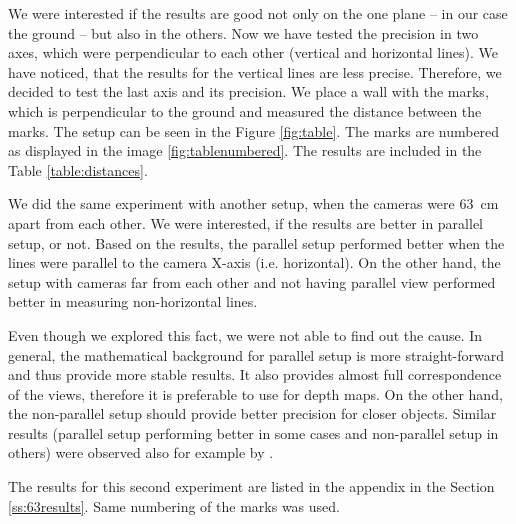We were interested if the results are good not only on the one plane -- in our
case the ground -- but also in the others. Now we have tested the precision in
two axes, which were perpendicular to each other (vertical and horizontal
lines). We have noticed, that the results for the vertical lines are less
precise. Therefore, we decided to test the last axis and its precision. We place
a wall with the marks, which is perpendicular to the ground and measured the
distance between the marks. The setup can be seen in the Figure
\ref{fig:table}. The marks are numbered as displayed in the image
\ref{fig:tablenumbered}. The results are included in the Table
\ref{table:distances}. 

We did the same experiment with another setup, when the cameras were 63~cm
apart from each other. We were interested, if the results are better in
parallel setup, or not. Based on the results, the parallel setup performed
better when the lines were parallel to the camera X-axis (i.e. horizontal). On
the other hand, the setup with cameras far from each other and not having
parallel view performed better in measuring non-horizontal lines. 

Even though we explored this fact, we were not able to find out the cause. In
general, the mathematical background for parallel setup is more
straight-forward and thus provide more stable results. It also provides almost
full correspondence of the views, therefore it is preferable to use for depth
maps. On the other hand, the non-parallel setup should provide better precision
for closer objects. Similar results (parallel setup performing better in some
cases and non-parallel setup in others) were observed also for example
by \citet*{cardenas19953d}.

The results for this second experiment are listed in the appendix in the
Section \ref{ss:63results}. Same numbering of the marks was used.

